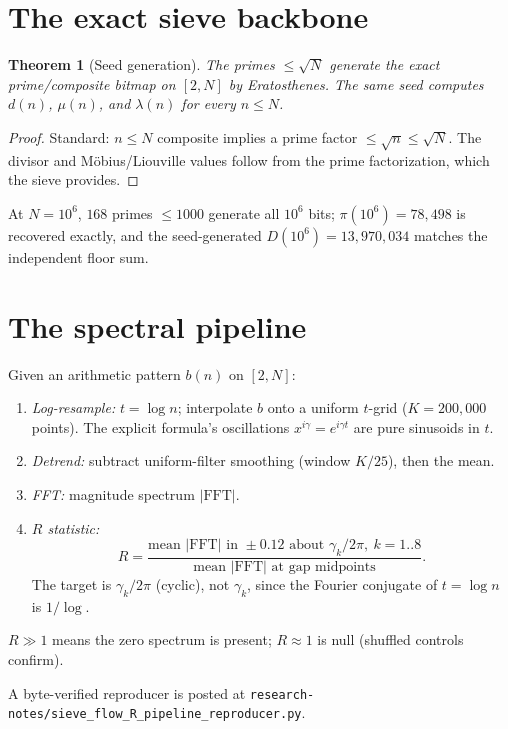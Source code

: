 \documentclass[11pt]{amsart}
\newtheorem{theorem}{Theorem}[section]
\theoremstyle{remark}
\begin{document}
\section{The exact sieve backbone}

\begin{theorem}[Seed generation]\label{thm:seed}
The primes $\le\sqrt{N}$ generate the exact prime/composite bitmap
on $[2,N]$ by Eratosthenes.  The same seed computes $d(n)$,
$\mu(n)$, and $\lambda(n)$ for every $n\le N$.
\end{theorem}
\begin{proof}
Standard: $n\le N$ composite implies a prime factor $\le\sqrt{n}\le
\sqrt{N}$.  The divisor and M\"obius/Liouville values follow from
the prime factorization, which the sieve provides.
\end{proof}

At $N=10^6$, $168$ primes $\le 1000$ generate all $10^6$ bits;
$\pi(10^6)=78{,}498$ is recovered exactly, and the seed-generated
$D(10^6)=13{,}970{,}034$ matches the independent floor sum.

\section{The spectral pipeline}
Given an arithmetic pattern $b(n)$ on $[2,N]$:
\begin{enumerate}[label=(\arabic*)]
\item \emph{Log-resample:} $t=\log n$; interpolate $b$ onto a uniform
$t$-grid ($K=200{,}000$ points).  The explicit formula's
oscillations $x^{i\gamma}=e^{i\gamma t}$ are pure sinusoids in $t$.
\item \emph{Detrend:} subtract uniform-filter smoothing (window
$K/25$), then the mean.
\item \emph{FFT:} magnitude spectrum $\lvert\mathrm{FFT}\rvert$.
\item \emph{$R$ statistic:}
\[
R=\frac{\text{mean }\lvert\mathrm{FFT}\rvert\text{ in }\pm0.12
\text{ about }\gamma_k/2\pi,\ k=1..8}
{\text{mean }\lvert\mathrm{FFT}\rvert\text{ at gap midpoints}}.
\]
The target is $\gamma_k/2\pi$ (cyclic), not $\gamma_k$, since the
Fourier conjugate of $t=\log n$ is $1/\log$.
\end{enumerate}
$R\gg1$ means the zero spectrum is present; $R\approx1$ is null
(shuffled controls confirm).

A byte-verified reproducer is posted at
\texttt{research-notes/sieve\_flow\_R\_pipeline\_reproducer.py}.
\end{document}
